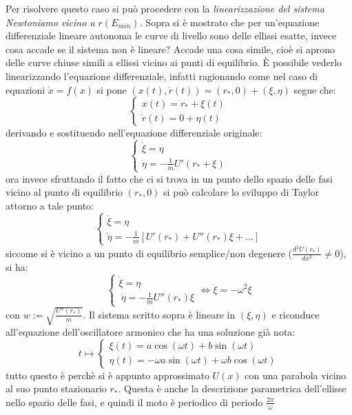 \documentclass[Main.tex]{subfiles}
\begin{document}
Per risolvere questo caso si può procedere con la
\emph{linearizzazione del sistema Newtoniamo vicino a $r(E_{min})$.}
Sopra si è mostrato che per un'equazione differenziale lineare autonoma le curve di livello sono delle ellissi esatte, invece cosa accade se il sistema non è lineare? Accade una cosa simile, cioè si aprono delle curve chiuse simili a ellissi vicino ai punti di equilibrio. È possibile vederlo linearizzando l'equazione differenziale, infatti ragionando come nel caso di equazioni $\dot x=f(x)$ si pone $(x(t),\dot r(t))=(r_*,0)+(\xi,\eta)$ segue che:
\begin{equation}
  \begin{cases}
x(t) =r_* + \xi(t)\\
\dot r(t)=0+ \eta(t)
\end{cases}
\end{equation}
derivando e sostituendo nell'equazione differenziale originale:
\begin{equation}
  \begin{cases}
	\dot \xi = \eta\\
	\dot \eta = - \frac{1}{m}  U'(r_* + \xi)
\end{cases}
\end{equation}
ora invece sfruttando il fatto che ci si trova in un punto dello spazio delle fasi vicino al punto di equilibrio $(r_*,0)$ si può calcolare lo sviluppo di Taylor attorno a tale punto:
\begin{equation}
  \begin{cases}
	\dot \xi = \eta\\
	\dot \eta = -\frac{1}{m} \left[U' (r_*) + U''(r_*) \xi + ... \right]
\end{cases}
\end{equation}
siccome si è vicino a un punto di equilibrio semplice/non degenere ($\frac{d^2 U(r_*)}{dx^2}\neq 0$), si ha:
\begin{equation}
  \begin{cases}
	\dot \xi = \eta\\\
	\dot \eta = - \frac{1}{m} U'' (r_*) \xi
\end{cases}
\iff \ddot \xi = - \omega ^2 \xi 
\end{equation}
con  $w:=\sqrt{\frac{U''(r_*)}{m}}$. Il sistema scritto sopra è lineare in $(\xi,\eta)$ e riconduce all'equazione dell'oscillatore armonico che ha una soluzione già nota:
\begin{equation}
  t \mapsto \begin{cases}
 \xi(t)=a \cos (\omega t) + b 	\sin (\omega t)\\
 \eta(t)= - \omega a \sin(\omega t) + \omega b \cos(\omega t)
 \end{cases}
\end{equation}
tutto questo è perchè si è appunto approssimato $U(x)$ con una parabola vicino al suo punto stazionario $r_*$. Questa è anche la descrizione parametrica dell'ellisse nello spazio delle fasi, e quindi il moto è periodico di periodo $\frac{2 \pi}{\omega}$
\end{document}
